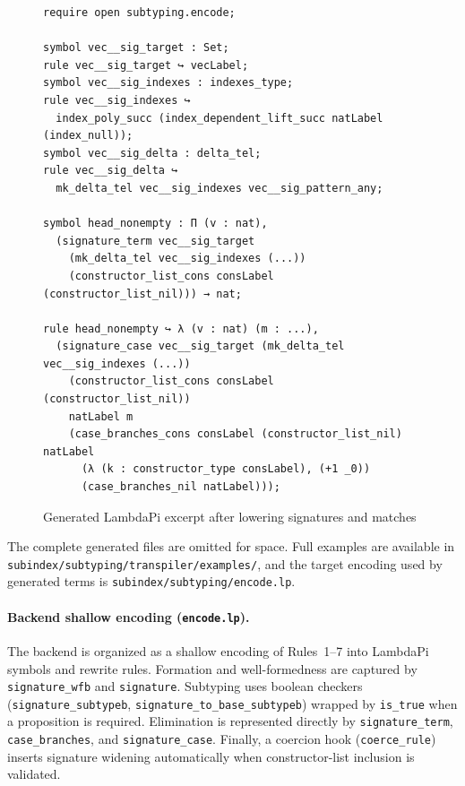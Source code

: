 \documentclass[a4paper, anonymous, UKenglish,cleveref, autoref, thm-restate]{lipics-v2021}
\begin{document}
\begin{figure}[!ht]
\begin{lstlisting}[language=Lambdapi, basicstyle={\ttfamily\scriptsize\upshape}, inputencoding=utf8, extendedchars=true]
require open subtyping.encode;

symbol vec__sig_target : Set;
rule vec__sig_target ↪ vecLabel;
symbol vec__sig_indexes : indexes_type;
rule vec__sig_indexes ↪
  index_poly_succ (index_dependent_lift_succ natLabel (index_null));
symbol vec__sig_delta : delta_tel;
rule vec__sig_delta ↪
  mk_delta_tel vec__sig_indexes vec__sig_pattern_any;

symbol head_nonempty : Π (v : nat),
  (signature_term vec__sig_target
    (mk_delta_tel vec__sig_indexes (...))
    (constructor_list_cons consLabel (constructor_list_nil))) → nat;

rule head_nonempty ↪ λ (v : nat) (m : ...),
  (signature_case vec__sig_target (mk_delta_tel vec__sig_indexes (...))
    (constructor_list_cons consLabel (constructor_list_nil))
    natLabel m
    (case_branches_cons consLabel (constructor_list_nil) natLabel
      (λ (k : constructor_type consLabel), (+1 _0))
      (case_branches_nil natLabel)));
\end{lstlisting}
\caption{Generated LambdaPi excerpt after lowering signatures and matches}
\label{fig:transpiler-output}
\end{figure}

The complete generated files are omitted for space. Full examples are available in \texttt{subindex/subtyping/transpiler/examples/}, and the target encoding used by generated terms is \texttt{subindex/subtyping/encode.lp}.

\paragraph*{Backend shallow encoding (\texttt{encode.lp}).}
The backend is organized as a shallow encoding of Rules~1--7 into LambdaPi symbols and rewrite rules. Formation and well-formedness are captured by \texttt{signature\_wfb} and \texttt{signature}. Subtyping uses boolean checkers (\texttt{signature\_subtypeb}, \texttt{signature\_to\_base\_subtypeb}) wrapped by \texttt{is\_true} when a proposition is required. Elimination is represented directly by \texttt{signature\_term}, \texttt{case\_branches}, and \texttt{signature\_case}. Finally, a coercion hook (\texttt{coerce\_rule}) inserts signature widening automatically when constructor-list inclusion is validated.
\end{document}
